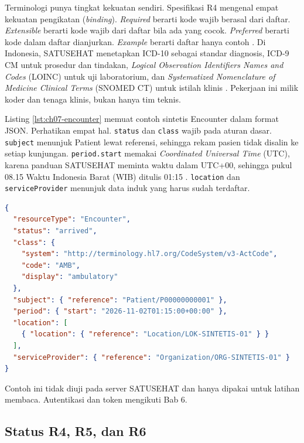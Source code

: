 Terminologi punya tingkat kekuatan sendiri. Spesifikasi R4 mengenal empat kekuatan pengikatan (\textit{binding}).
\textit{Required} berarti kode wajib berasal dari daftar. \textit{Extensible} berarti kode wajib dari daftar bila ada
yang cocok. \textit{Preferred} berarti kode dalam daftar dianjurkan. \textit{Example} berarti daftar hanya contoh
\cite{c07-fhir-terminologi}. Di Indonesia, SATUSEHAT menetapkan ICD-10 sebagai standar diagnosis, ICD-9 CM untuk
prosedur dan tindakan, \textit{Logical Observation Identifiers Names and Codes} (LOINC) untuk uji laboratorium, dan
\textit{Systematized Nomenclature of Medicine Clinical Terms} (SNOMED CT) untuk istilah klinis
\cite{c07-satusehat-terminologi}. Pekerjaan ini milik koder dan tenaga klinis, bukan hanya tim teknis.

\begin{pendalaman}[title={Pendalaman Teknis (opsional): Membaca Patient dan Encounter}]
Listing \ref{lst:ch07-encounter} memuat contoh sintetis Encounter dalam format JSON. Perhatikan empat hal.
\texttt{status} dan \texttt{class} wajib pada aturan dasar. \texttt{subject} menunjuk Patient lewat referensi,
sehingga rekam pasien tidak disalin ke setiap kunjungan. \texttt{period.start} memakai \textit{Coordinated Universal
Time} (UTC), karena panduan SATUSEHAT meminta waktu dalam UTC+00, sehingga pukul 08.15 Waktu Indonesia Barat (WIB)
ditulis 01:15 \cite{c07-satusehat-rajal}. \texttt{location} dan \texttt{serviceProvider} menunjuk data induk yang
harus sudah terdaftar.

\begin{lstlisting}[language=json, xleftmargin=8pt, captionpos=b, caption={Contoh sintetis Encounter, tersedia di \berkas{sources/chapter07/contoh-resource-fhir.md}}, label={lst:ch07-encounter}]
{
  "resourceType": "Encounter",
  "status": "arrived",
  "class": {
    "system": "http://terminology.hl7.org/CodeSystem/v3-ActCode",
    "code": "AMB",
    "display": "ambulatory"
  },
  "subject": { "reference": "Patient/P00000000001" },
  "period": { "start": "2026-11-02T01:15:00+00:00" },
  "location": [
    { "location": { "reference": "Location/LOK-SINTETIS-01" } }
  ],
  "serviceProvider": { "reference": "Organization/ORG-SINTETIS-01" }
}
\end{lstlisting}

Contoh ini tidak diuji pada server SATUSEHAT dan hanya dipakai untuk latihan membaca. Autentikasi dan token mengikuti
Bab 6.
\end{pendalaman}

\subsection{Status R4, R5, dan R6}


